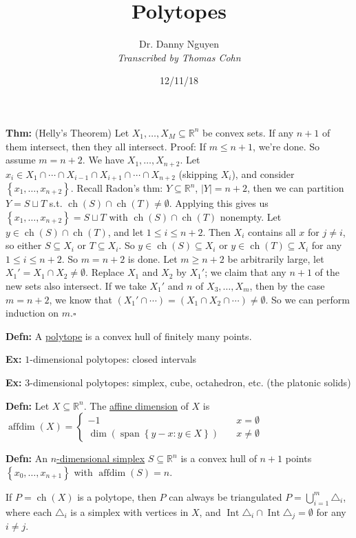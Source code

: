 \documentclass[10pt,letterpaper]{article}
\author{Dr. Danny Nguyen\\ \small\textit{Transcribed by Thomas Cohn}}
\title{Polytopes}
\date{12/11/18} %
\newcommand{\n}{\hfill\break}
\newcommand{\defn}[1]{\par\noindent\settowidth{\hangindent}{\textbf{Defn: }}\textbf{Defn: }#1\n}
\newcommand{\thm}[1]{\par\noindent\settowidth{\hangindent}{\textbf{Thm: }}\textbf{Thm: }#1\n}
\newcommand{\ex}[1]{\par\noindent\settowidth{\hangindent}{\textbf{Ex: }}\textbf{Ex: }#1\n}
\newcommand{\proven}{\;$\square$\n}
\newcommand{\card}[1]{\left|#1\right|}
\newcommand{\set}[1]{\left\{#1\right\}}
\newcommand{\reals}{\mathbb{R}}
\newcommand{\R}{\reals}
\DeclareMathOperator{\affdim}{affdim}
\newcommand{\tri}{\triangle}
\DeclareMathOperator{\vspan}{span}
\DeclareMathOperator{\Int}{Int}
\DeclareMathOperator{\ch}{ch}
\newcommand{\st}{s.t.}
\begin{document}
\maketitle
\setlength\RaggedRightParindent{\parindent}
\RaggedRight

\thm{(Helly's Theorem) Let $X_{1},\ldots,X_{M}\subseteq\R^{n}$ be convex sets.\n
If any $n+1$ of them intersect, then they all intersect.\n
Proof: If $m\le{}n+1$, we're done. So assume $m=n+2$. We have $X_{1},\ldots,X_{n+2}$.\n
Let $x_{i}\in{}X_{1}\cap\cdots\cap{}X_{i-1}\cap{}X_{i+1}\cap\cdots\cap{}X_{n+2}$ (skipping $X_{i}$), and consider $\set{x_{1},\ldots,x_{n+2}}$.\n
\n
Recall Radon's thm: $Y\subseteq\R^{n}$, $\card{Y}=n+2$, then we can partition $Y=S\sqcup{}T$ \st{} $\ch(S)\cap\ch(T)\ne\emptyset$. Applying this gives us $\set{x_{1},\ldots,x_{n+2}}=S\sqcup{}T$ with $\ch(S)\cap\ch(T)$ nonempty.\n
\n
Let $y\in\ch(S)\cap\ch(T)$, and let $1\le{}i\le{}n+2$. Then $X_{i}$ contains all $x$ for $j\ne{}i$, so either $S\subseteq{}X_{i}$ or $T\subseteq{}X_{i}$. So $y\in\ch(S)\subseteq{}X_{i}$ or $y\in\ch(T)\subseteq{}X_{i}$ for any $1\le{}i\le{}n+2$. So $m=n+2$ is done.\n
\n
Let $m\ge{}n+2$ be arbitrarily large, let $X_{1}'=X_{1}\cap{}X_{2}\ne\emptyset$. Replace $X_{1}$ and $X_{2}$ by $X_{1}'$; we claim that any $n+1$ of the new sets also intersect. If we take $X_{1}'$ and $n$ of $X_{3},\ldots,X_{m}$, then by the case $m=n+2$, we know that $(X_{1}'\cap\cdots)=(X_{1}\cap{}X_{2}\cap\cdots)\ne\emptyset$. So we can perform induction on $m$.\proven
}

\defn{A \underline{polytope} is a convex hull of finitely many points.}

\ex{$1$-dimensional polytopes: closed intervals}

\ex{$3$-dimensional polytopes: simplex, cube, octahedron, etc. (the platonic solids)}

\defn{Let $X\subseteq\R^{n}$. The \underline{affine dimension} of $X$ is $\affdim(X)=\left\{\begin{array}{ll}-1 & \quad{}x=\emptyset \\ \dim(\vspan\set{y-x:y\in{}X}) & \quad{}x\ne\emptyset\end{array}\right.$}

\defn{An \underline{$n$-dimensional simplex} $S\subseteq\R^{n}$ is a convex hull of $n+1$ points $\set{x_{0},\ldots,x_{n+1}}$ with $\affdim(S)=n$.}

\par\noindent If $P=\ch(X)$ is a polytope, then $P$ can always be triangulated $P=\bigcup_{i=1}^{m}\tri_{i}$, where each $\tri_{i}$ is a simplex with vertices in $X$, and $\Int\tri_{i}\cap\Int\tri_{j}=\emptyset$ for any $i\ne{}j$.
\end{document}
